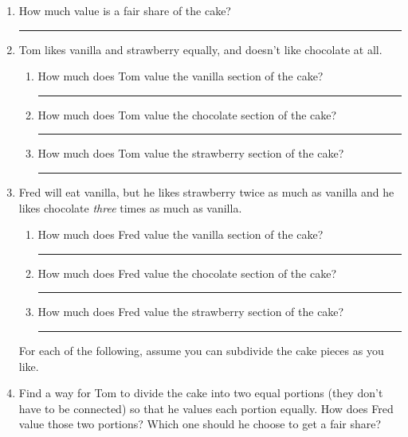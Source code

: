 \documentclass[12pt]{article}
\newcommand{\ans}[1][1in]{\rule{#1}{.5pt}}
\begin{document}
\begin{enumerate}
\item How much value is a fair share of the cake? \ans

\item Tom likes vanilla and strawberry equally, and doesn't like chocolate at all. 
\begin{enumerate}
\item How much does Tom value the vanilla section of the cake? \ans
\item How much does Tom value the chocolate section of the cake? \ans
\item How much does Tom value the strawberry section of the cake? \ans
\end{enumerate}
\hfill{}

\item Fred will eat vanilla, but he likes strawberry twice as much as vanilla and he likes chocolate \emph{three} times as much as vanilla.
\begin{enumerate}
\item How much does Fred value the vanilla section of the cake? \ans
\item How much does Fred value the chocolate section of the cake? \ans
\item How much does Fred value the strawberry section of the cake? \ans
\end{enumerate}
\hfill{}

\newpage

For each of the following, assume you can subdivide the cake pieces as you like.

\item Find a way for Tom to divide the cake into two equal portions (they don't have to be connected) so that he values each portion equally. How does Fred value those two portions? Which one should he choose to get a fair share?
\def\r{1.2}

\hspace{2cm}
\vfill


\end{enumerate}
\end{document}
